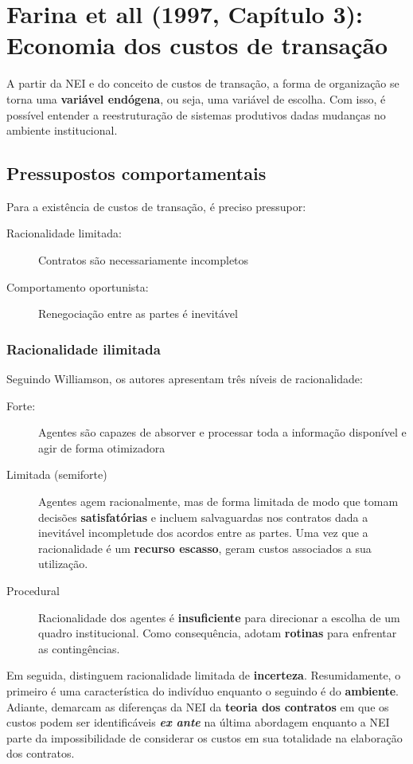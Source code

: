 \section*{Farina et all (1997, Capítulo 3): Economia dos custos de transação}

A partir da NEI e do conceito de custos de transação, a forma de organização se torna uma \textbf{variável endógena}, ou seja, uma variável de escolha. Com isso, é possível entender a reestruturação de sistemas produtivos dadas mudanças no ambiente institucional.

\subsection*{Pressupostos comportamentais}

Para a existência de custos de transação, é preciso pressupor:

\begin{description}
	\item[Racionalidade limitada:] Contratos são necessariamente incompletos
	\item[Comportamento oportunista:] Renegociação entre as partes é inevitável
\end{description}

\subsubsection*{Racionalidade ilimitada}

Seguindo Williamson, os autores apresentam três níveis de racionalidade:

\begin{description}
	\item[Forte:] Agentes são capazes de absorver e processar toda a informação disponível e agir de forma otimizadora
	\item[Limitada (semiforte)] Agentes agem racionalmente, mas de forma limitada de modo que tomam decisões \textbf{satisfatórias} e incluem salvaguardas nos contratos dada a inevitável incompletude dos acordos entre as partes. Uma vez que a racionalidade é um \textbf{recurso escasso}, geram custos associados a sua utilização.
	\item[Procedural] Racionalidade dos agentes é \textbf{insuficiente} para direcionar a escolha de um quadro institucional. Como consequência, adotam \textbf{rotinas} para enfrentar as contingências.
\end{description}

Em seguida, distinguem racionalidade limitada de \textbf{incerteza}. Resumidamente, o primeiro é uma característica do indivíduo enquanto o seguindo é do \textbf{ambiente}.
Adiante, demarcam as diferenças da NEI da \textbf{teoria dos contratos} em que os custos podem ser identificáveis \textit{\textbf{ex ante}} na última abordagem enquanto a NEI parte da impossibilidade  de considerar os custos em sua totalidade na elaboração dos contratos.

